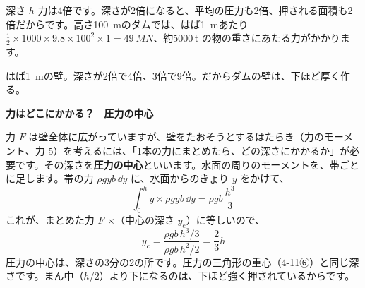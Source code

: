 \begin{phbaisuru}{深さ $h$}
力は4倍です。深さが2倍になると、平均の圧力も2倍、押される面積も2倍だからです。高さ\qty{100}{m}のダムでは、はば\qty{1}{m}あたり $\tfrac{1}{2}\times1000\times9.8\times100^2\times1=\qty{49}{MN}$、約\num{5000}\,t の物の重さにあたる力がかかります。
\par\vspace{2pt}\centering
{}
\par\raggedright{\small はば\qty{1}{m}の壁。深さが2倍で4倍、3倍で9倍。だからダムの壁は、下ほど厚く作る。}
\end{phbaisuru}

\noindent\textbf{力はどこにかかる？　圧力の中心}\par\nobreak
\label{ph:力-12:center}力 $F$ は壁全体に広がっていますが、壁をたおそうとするはたらき（力のモーメント、力-5）を考えるには、「1本の力にまとめたら、どの深さにかかるか」が必要です。その深さを\textbf{圧力の中心}といいます。水面の周りのモーメントを、帯ごとに足します。帯の力 $\rho gyb\,\dd y$ に、水面からのきょり $y$ をかけて、
\[ \int_0^h y\times\rho gyb\,\dd y=\rho gb\,\frac{h^3}{3} \]
これが、まとめた力 $F$ ×（中心の深さ $y_{\mathrm{c}}$）に等しいので、
\[ y_{\mathrm{c}}=\frac{\rho gb\,h^3/3}{\rho gb\,h^2/2}=\frac{2}{3}h \]
圧力の中心は、深さの3分の2の所です。圧力の三角形の重心（4-11⑥）と同じ深さです。まん中（$h/2$）より下になるのは、下ほど強く押されているからです。

